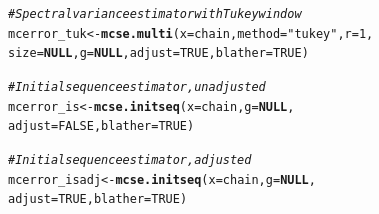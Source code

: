\documentclass[11pt]{article}\usepackage[]{graphicx}\usepackage[]{color}
\makeatletter
\newcommand{\hlnum}[1]{\textcolor[rgb]{0.686,0.059,0.569}{#1}}%
\newcommand{\hlstr}[1]{\textcolor[rgb]{0.192,0.494,0.8}{#1}}%
\newcommand{\hlcom}[1]{\textcolor[rgb]{0.678,0.584,0.686}{\textit{#1}}}%
\newcommand{\hlstd}[1]{\textcolor[rgb]{0.345,0.345,0.345}{#1}}%
\newcommand{\hlkwa}[1]{\textcolor[rgb]{0.161,0.373,0.58}{\textbf{#1}}}%
\newcommand{\hlkwb}[1]{\textcolor[rgb]{0.69,0.353,0.396}{#1}}%
\newcommand{\hlkwc}[1]{\textcolor[rgb]{0.333,0.667,0.333}{#1}}%
\newcommand{\hlkwd}[1]{\textcolor[rgb]{0.737,0.353,0.396}{\textbf{#1}}}%
\newenvironment{kframe}{%
 \def\at@end@of@kframe{}%
 \ifinner\ifhmode%
  \def\at@end@of@kframe{\end{minipage}}%
  \begin{minipage}{\columnwidth}%
 \fi\fi%
 \def\FrameCommand##1{\hskip\@totalleftmargin \hskip-\fboxsep
 \colorbox{shadecolor}{##1}\hskip-\fboxsep
     \hskip-\linewidth \hskip-\@totalleftmargin \hskip\columnwidth}%
 \MakeFramed {\advance\hsize-\width
   \@totalleftmargin\z@ \linewidth\hsize
   \@setminipage}}%
 {\par\unskip\endMakeFramed%
 \at@end@of@kframe}
\newenvironment{knitrout}{}{} %
\makeatother
\begin{document}
\begin{knitrout}
\begin{kframe}
\begin{alltt}
\hlcom{# Spectral variance estimator with Tukey window}
\hlstd{mcerror_tuk} \hlkwb{<-} \hlkwd{mcse.multi}\hlstd{(}\hlkwc{x} \hlstd{= chain,} \hlkwc{method} \hlstd{=}  \hlstr{"tukey"}\hlstd{,} \hlkwc{r} \hlstd{=} \hlnum{1}\hlstd{,}
        \hlkwc{size} \hlstd{=} \hlkwa{NULL}\hlstd{,} \hlkwc{g} \hlstd{=} \hlkwa{NULL}\hlstd{,} \hlkwc{adjust} \hlstd{=} \hlnum{TRUE}\hlstd{,} \hlkwc{blather} \hlstd{=} \hlnum{TRUE}\hlstd{)}

\hlcom{# Initial sequence estimator, unadjusted}
\hlstd{mcerror_is} \hlkwb{<-} \hlkwd{mcse.initseq}\hlstd{(}\hlkwc{x} \hlstd{= chain,} \hlkwc{g} \hlstd{=} \hlkwa{NULL}\hlstd{,}
                           \hlkwc{adjust} \hlstd{=} \hlnum{FALSE}\hlstd{,} \hlkwc{blather} \hlstd{=} \hlnum{TRUE}\hlstd{)}

\hlcom{# Initial sequence estimator, adjusted}
\hlstd{mcerror_isadj} \hlkwb{<-} \hlkwd{mcse.initseq}\hlstd{(}\hlkwc{x} \hlstd{= chain,} \hlkwc{g} \hlstd{=} \hlkwa{NULL}\hlstd{,}
                              \hlkwc{adjust} \hlstd{=} \hlnum{TRUE}\hlstd{,} \hlkwc{blather} \hlstd{=} \hlnum{TRUE}\hlstd{)}
\end{alltt}
\end{kframe}
\end{knitrout}
\end{document}
